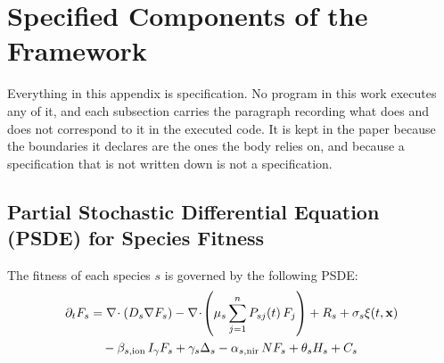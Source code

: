 \documentclass[11pt]{article}
\begin{document}
\appendix

\section{Specified Components of the Framework}
\label{app:specification}

Everything in this appendix is specification. No program in this work executes any of it, and
each subsection carries the paragraph recording what does and does not correspond to it in the
executed code. It is kept in the paper because the boundaries it declares are the ones the
body relies on, and because a specification that is not written down is not a specification.


\subsection{Partial Stochastic Differential Equation (PSDE) for Species Fitness}
\label{sec:psde}

The fitness of each species $s$ is governed by the following PSDE:
\begin{align}
\partial_t F_s
  &= \nabla\!\cdot(D_s\nabla F_s)
   - \nabla\!\cdot\!\left(\mu_s\sum_{j=1}^n P_{sj}(t)\,F_j\right)
   + R_s
   + \sigma_s\xi(t,\mathbf{x}) \notag \\
  &\quad
   - \beta_{s,\mathrm{ion}}\,I_\gamma F_s
   + \gamma_s\Delta_s
   - \alpha_{s,\mathrm{nir}}\,N F_s
   + \theta_s H_s
   + C_s
  \label{eq:psde}
\end{align}
\end{document}
